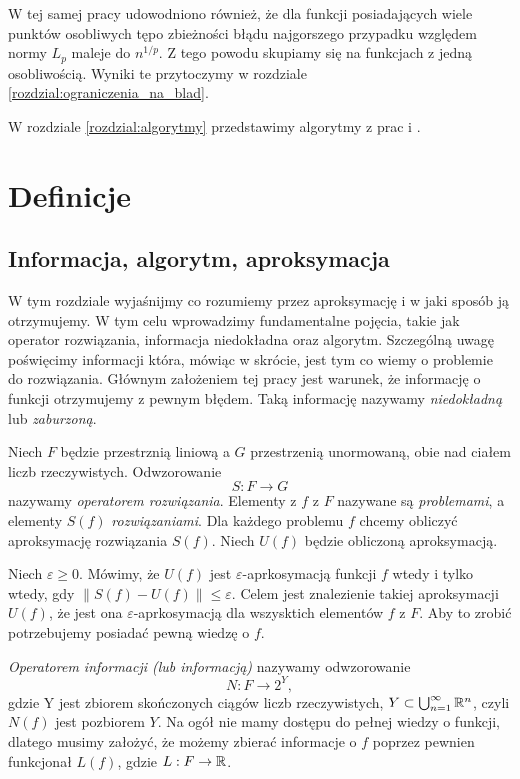 \documentclass[oik, pdftex, robocza, man]{mgrwms}
\begin{document}
\begin{wstep}[Wprowadzenie]
    W tej samej pracy udowodniono również, że dla funkcji posiadających wiele punktów osobliwych tępo zbieżności błądu najgorszego przypadku względem normy $L_{p}$ maleje do $n^{1/p}$. Z tego powodu skupiamy się na funkcjach z jedną osobliwością. Wyniki te przytoczymy w rozdziale \ref{rozdzial:ograniczenia_na_blad}.

    W rozdziale \ref{rozdzial:algorytmy} przedstawimy algorytmy z prac \cite{AoP} i \cite{CoDF}.

\end{wstep}


\chapter{Definicje}


\section{Informacja, algorytm, aproksymacja}


    W tym rozdziale wyjaśnijmy co rozumiemy przez aproksymację i w jaki sposób ją otrzymujemy. W tym celu wprowadzimy fundamentalne pojęcia, takie jak operator rozwiązania, informacja niedokładna oraz algorytm. Szczególną uwagę poświęcimy informacji która, mówiąc w skrócie, jest tym co wiemy o problemie do rozwiązania. Głównym założeniem tej pracy jest warunek, że informację o funkcji otrzymujemy z pewnym błędem. Taką informację nazywamy \textit{niedokładną} lub \textit{zaburzoną}.

    Niech $F$ będzie przestrznią liniową a $G$ przestrzenią unormowaną, obie nad ciałem liczb rzeczywistych. Odwzorowanie 
    \begin{equation*}
        S : F \rightarrow G
    \end{equation*}
    nazywamy \textit{operatorem rozwiązania}. Elementy z $f$ z $F$ nazywane są \textit{problemami}, a elementy $S(f)$ \textit{rozwiązaniami}. Dla każdego problemu $f$ chcemy obliczyć aproksymację rozwiązania $S(f)$. Niech $U(f)$ będzie obliczoną aproksymacją.

    Niech $\varepsilon \geq 0$. Mówimy, że $U(f)$ jest $\varepsilon$-aprkosymacją funkcji $f$ wtedy i tylko wtedy, gdy $\| S(f) -  U(f)\| \leq \varepsilon$. Celem jest znalezienie takiej aproksymacji $U(f)$, że jest ona $\varepsilon$-aprkosymacją dla wszysktich elementów $f$ z $F$. Aby to zrobić potrzebujemy posiadać pewną wiedzę o $f$.

    \textit{Operatorem informacji (lub informacją)} nazywamy odwzorowanie
    \begin{equation*}
        N : F \rightarrow 2^{Y},
    \end{equation*}
    gdzie Y jest zbiorem skończonych ciągów liczb rzeczywistych, $ Y \subset \bigcup^{\infty}_{n=1} \mathbb{R}^{n}$, czyli $N(f)$ jest pozbiorem $Y$.
    Na ogół nie mamy dostępu do pełnej wiedzy o funkcji, dlatego musimy założyć, że możemy zbierać informacje o $f$ poprzez pewnien funkcjonał $L(f)$, gdzie $L : F \rightarrow \mathbb{R}$.
    
\end{document}
